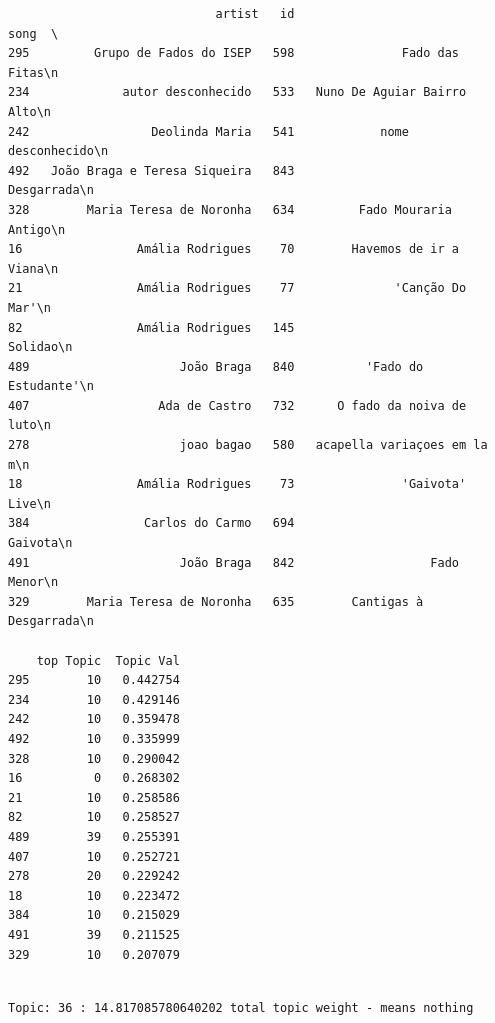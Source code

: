 \documentclass[11pt]{article}
\begin{document}
    
    \begin{verbatim}
                             artist   id                           song  \
295         Grupo de Fados do ISEP   598               Fado das Fitas\n   
234             autor desconhecido   533   Nuno De Aguiar Bairro Alto\n   
242                 Deolinda Maria   541            nome desconhecido\n   
492   João Braga e Teresa Siqueira   843                   Desgarrada\n   
328        Maria Teresa de Noronha   634         Fado Mouraria Antigo\n   
16                Amália Rodrigues    70        Havemos de ir a Viana\n   
21                Amália Rodrigues    77              'Canção Do Mar'\n   
82                Amália Rodrigues   145                      Solidao\n   
489                     João Braga   840          'Fado do Estudante'\n   
407                  Ada de Castro   732      O fado da noiva de luto\n   
278                     joao bagao   580   acapella variaçoes em la m\n   
18                Amália Rodrigues    73               'Gaivota' Live\n   
384                Carlos do Carmo   694                      Gaivota\n   
491                     João Braga   842                   Fado Menor\n   
329        Maria Teresa de Noronha   635        Cantigas à Desgarrada\n   

    top Topic  Topic Val  
295        10   0.442754  
234        10   0.429146  
242        10   0.359478  
492        10   0.335999  
328        10   0.290042  
16          0   0.268302  
21         10   0.258586  
82         10   0.258527  
489        39   0.255391  
407        10   0.252721  
278        20   0.229242  
18         10   0.223472  
384        10   0.215029  
491        39   0.211525  
329        10   0.207079  
    \end{verbatim}

    
    \begin{Verbatim}[commandchars=\\\{\}]

Topic: 36 : 14.817085780640202 total topic weight - means nothing

    \end{Verbatim}
\end{document}
